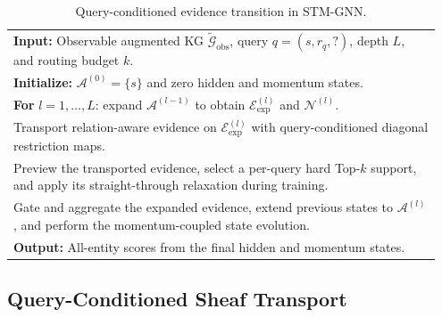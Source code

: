 \documentclass[a4paper,fleqn]{cas-sc}
\begin{document}
\begin{table}[t]
\caption{Query-conditioned evidence transition in STM-GNN.}
\label{tab:algorithm_stmgnn}
\centering
\small
\begin{tabular}{p{0.95\linewidth}}
\toprule
\textbf{Input:} Observable augmented KG
$\widetilde{\mathcal{G}}_{\mathrm{obs}}$, query $q=(s,r_q,?)$, depth $L$,
and routing budget $k$.\\
\textbf{Initialize:} $\mathcal{A}^{(0)}=\{s\}$ and zero hidden and momentum states.\\
\textbf{For} $l=1,\ldots,L$: expand $\mathcal{A}^{(l-1)}$ to obtain $\mathcal{E}_{\mathrm{exp}}^{(l)}$ and $\mathcal{N}^{(l)}$.\\
Transport relation-aware evidence on $\mathcal{E}_{\mathrm{exp}}^{(l)}$ with query-conditioned diagonal restriction maps.\\
Preview the transported evidence, select a per-query hard Top-$k$ support, and apply its straight-through relaxation during training.\\
Gate and aggregate the expanded evidence, extend previous states to $\mathcal{A}^{(l)}$, and perform the momentum-coupled state evolution.\\
\textbf{Output:} All-entity scores from the final hidden and momentum states.\\
\bottomrule
\end{tabular}
\end{table}

\subsection{Query-Conditioned Sheaf Transport}\label{subsec:sheaf_module}
\end{document}
